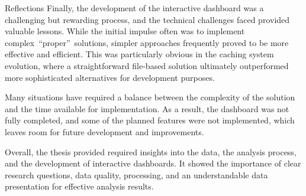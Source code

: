 \begin{section}{Reflections}
	Finally, the development of the interactive dashboard was a challenging but rewarding process, and the technical challenges faced provided valuable lessons.
	While the initial impulse often was to implement complex~\enquote{proper}~solutions, simpler approaches frequently proved to be more effective and efficient.
	This was particularly obvious in the caching system evolution, where a straightforward file-based solution ultimately outperformed more sophisticated alternatives for development purposes.

	Many situations have required a balance between the complexity of the solution and the time available for implementation.
	As a result, the dashboard was not fully completed, and some of the planned features were not implemented, which leaves room for future development and improvements.

	Overall, the thesis provided required insights into the data, the analysis process, and the development of interactive dashboards.
	It showed the importance of clear research questions, data quality, processing, and an understandable data presentation for effective analysis results.
\end{section}

